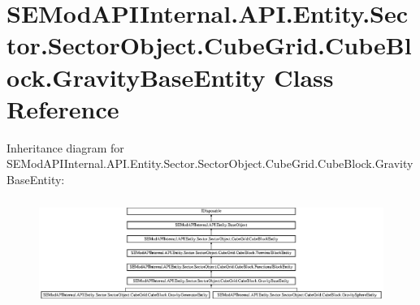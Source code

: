 \hypertarget{class_s_e_mod_a_p_i_internal_1_1_a_p_i_1_1_entity_1_1_sector_1_1_sector_object_1_1_cube_grid_1_19775a6da854269d8b1b6a1ac0a29f275}{}\section{S\+E\+Mod\+A\+P\+I\+Internal.\+A\+P\+I.\+Entity.\+Sector.\+Sector\+Object.\+Cube\+Grid.\+Cube\+Block.\+Gravity\+Base\+Entity Class Reference}
\label{class_s_e_mod_a_p_i_internal_1_1_a_p_i_1_1_entity_1_1_sector_1_1_sector_object_1_1_cube_grid_1_19775a6da854269d8b1b6a1ac0a29f275}
Inheritance diagram for S\+E\+Mod\+A\+P\+I\+Internal.\+A\+P\+I.\+Entity.\+Sector.\+Sector\+Object.\+Cube\+Grid.\+Cube\+Block.\+Gravity\+Base\+Entity\+:\begin{figure}[H]
\begin{center}
\leavevmode
\includegraphics[height=3.518851cm]{class_s_e_mod_a_p_i_internal_1_1_a_p_i_1_1_entity_1_1_sector_1_1_sector_object_1_1_cube_grid_1_19775a6da854269d8b1b6a1ac0a29f275}
\end{center}
\end{figure}
